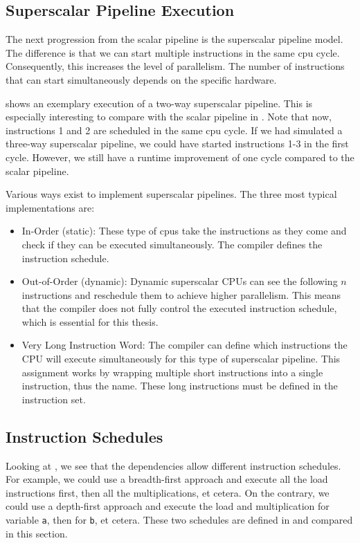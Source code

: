 \subsection{Superscalar Pipeline Execution}
\label{sec:bg:superscalar-cpu}
The next progression from the scalar pipeline is the superscalar pipeline model.
The difference is that we can start multiple instructions in the same \ac{cpu} cycle.
Consequently, this increases the level of parallelism.
The number of instructions that can start simultaneously depends on the specific hardware. %

 shows an exemplary execution of a two-way superscalar pipeline.
This is especially interesting to compare with the scalar pipeline in .
Note that now, instructions 1 and 2 are scheduled in the same \ac{cpu} cycle.
If we had simulated a three-way superscalar pipeline, we could have started instructions 1-3 in the first cycle.
However, we still have a runtime improvement of one cycle compared to the scalar pipeline.

Various ways exist to implement superscalar pipelines.
The three most typical implementations are:
\begin{itemize}
    \item In-Order (static): 
        These type of \acp{cpu} take the instructions as they come and check if they can be executed simultaneously.
        The compiler defines the instruction schedule.
    \item Out-of-Order (dynamic): 
        Dynamic superscalar CPUs can see the following $n$ instructions and reschedule them to achieve higher parallelism.
        This means that the compiler does not fully control the executed instruction schedule, which is essential for this thesis.
    \item Very Long Instruction Word: 
        The compiler can define which instructions the CPU will execute simultaneously for this type of superscalar pipeline.
        This assignment works by wrapping multiple short instructions into a single instruction, thus the name.
        These long instructions must be defined in the instruction set.
\end{itemize}

\subsection{Instruction Schedules}
\label{sec:bg:cpu-schedule}
Looking at , we see that the dependencies allow different instruction schedules.
For example, we could use a breadth-first approach and execute all the load instructions first, then all the multiplications, et cetera.
On the contrary, we could use a depth-first approach and execute the load and multiplication for variable \lstinline|a|, then for \lstinline|b|, et cetera.
These two schedules are defined in  and compared in this section.

